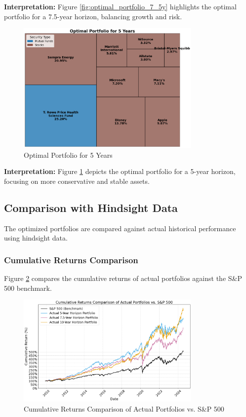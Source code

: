 \textbf{Interpretation:} Figure \ref{fig:optimal_portfolio_7_5y} highlights the optimal portfolio for a 7.5-year horizon, balancing growth and risk.

\begin{figure}[!htbp]
    \centering
    \includegraphics[width=0.8\textwidth]{../Figures/optimal_portfolio_5_years.png}
    \caption{Optimal Portfolio for 5 Years}
    \label{fig:optimal_portfolio_5y}
\end{figure}

\textbf{Interpretation:} Figure \ref{fig:optimal_portfolio_5y} depicts the optimal portfolio for a 5-year horizon, focusing on more conservative and stable assets.









\subsection{Comparison with Hindsight Data}
The optimized portfolios are compared against actual historical performance using hindsight data.

\subsubsection{Cumulative Returns Comparison}
Figure \ref{fig:cumulative_returns_comparison} compares the cumulative returns of actual portfolios against the S\&P 500 benchmark.

\begin{figure}[!htbp]
    \centering
    \includegraphics[width=0.8\textwidth]{../Figures/cumulative_returns_comparison.png}
    \caption{Cumulative Returns Comparison of Actual Portfolios vs. S\&P 500}
    \label{fig:cumulative_returns_comparison}
\end{figure}

